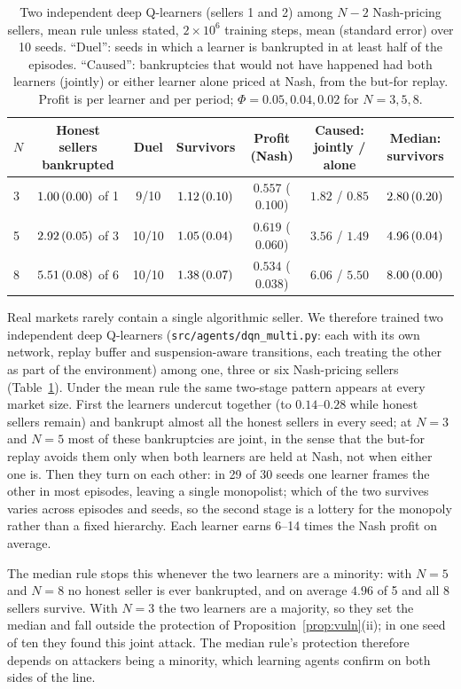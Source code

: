 \documentclass{article}
\newcommand{\se}[1]{\,{\scriptsize(#1)}}
\begin{document}
\begin{table}[t]
\centering
\caption{Two independent deep Q-learners (sellers 1 and 2) among $N-2$ Nash-pricing sellers, mean rule unless stated, $2\times10^6$ training steps, mean (standard error) over 10 seeds. ``Duel'': seeds in which a learner is bankrupted in at least half of the episodes. ``Caused'': bankruptcies that would not have happened had both learners (jointly) or either learner alone priced at Nash, from the but-for replay. Profit is per learner and per period; $\Phi=0.05,0.04,0.02$ for $N=3,5,8$.}
\label{tab:twolearners}
\small
\begin{tabular}{@{}lcccccc@{}}
\toprule
$N$ & Honest sellers bankrupted & Duel & Survivors & Profit (Nash) & Caused: jointly / alone & Median: survivors \\
\midrule
3 & $1.00\se{0.00}$ of 1 & 9/10  & $1.12\se{0.10}$ & $0.557$ ($0.100$) & $1.82$ / $0.85$ & $2.80\se{0.20}$ \\
5 & $2.92\se{0.05}$ of 3 & 10/10 & $1.05\se{0.04}$ & $0.619$ ($0.060$) & $3.56$ / $1.49$ & $4.96\se{0.04}$ \\
8 & $5.51\se{0.08}$ of 6 & 10/10 & $1.38\se{0.07}$ & $0.534$ ($0.038$) & $6.06$ / $5.50$ & $8.00\se{0.00}$ \\
\bottomrule
\end{tabular}
\end{table}

Real markets rarely contain a single algorithmic seller. We therefore trained two independent deep Q-learners (\texttt{src/agents/dqn\_multi.py}: each with its own network, replay buffer and suspension-aware transitions, each treating the other as part of the environment) among one, three or six Nash-pricing sellers (Table~\ref{tab:twolearners}). Under the mean rule the same two-stage pattern appears at every market size. First the learners undercut together (to $0.14$--$0.28$ while honest sellers remain) and bankrupt almost all the honest sellers in every seed; at $N=3$ and $N=5$ most of these bankruptcies are joint, in the sense that the but-for replay avoids them only when both learners are held at Nash, not when either one is. Then they turn on each other: in 29 of 30 seeds one learner frames the other in most episodes, leaving a single monopolist; which of the two survives varies across episodes and seeds, so the second stage is a lottery for the monopoly rather than a fixed hierarchy. Each learner earns 6--14 times the Nash profit on average.

The median rule stops this whenever the two learners are a minority: with $N=5$ and $N=8$ no honest seller is ever bankrupted, and on average $4.96$ of 5 and all 8 sellers survive. With $N=3$ the two learners are a majority, so they set the median and fall outside the protection of Proposition~\ref{prop:vuln}(ii); in one seed of ten they found this joint attack. The median rule's protection therefore depends on attackers being a minority, which learning agents confirm on both sides of the line.
\end{document}
